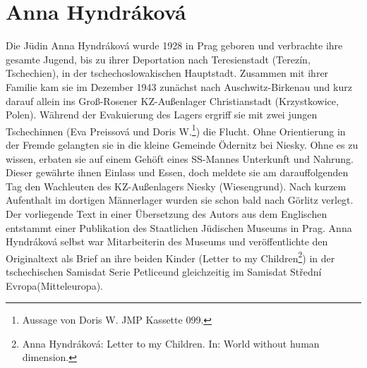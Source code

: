 \documentclass[a4paper,12pt,ngerman,
]{nisebook}
\begin{document}
\section*{Anna Hyndr\'akov\'a}
Die Jüdin Anna Hyndr\'akov\'a wurde 1928 in Prag geboren und verbrachte ihre gesamte Jugend, bis zu ihrer Deportation nach Teresienstadt (Terez\'in, Tschechien), in der tschechoslowakischen Hauptstadt. Zusammen mit ihrer Familie kam sie im Dezember 1943 zunächst nach Auschwitz-Birkenau und kurz darauf allein ins Groß-Rosener KZ-Außenlager Christianstadt (Krzystkowice, Polen). Während der Evakuierung des Lagers ergriff sie mit zwei jungen Tschechinnen (Eva Preissov\'a und Doris W.\footnote{Aussage von Doris W. JMP Kassette 099.}) die Flucht. Ohne Orientierung in der Fremde gelangten sie in die kleine Gemeinde Ödernitz bei Niesky. Ohne es zu wissen, erbaten sie auf einem Gehöft eines SS-Mannes Unterkunft und Nahrung. Dieser gewährte ihnen Einlass und Essen, doch meldete sie am darauffolgenden Tag den Wachleuten des KZ-Außenlagers Niesky (Wiesengrund). Nach kurzem Aufenthalt im dortigen Männerlager wurden sie schon bald nach Görlitz verlegt. Der vorliegende Text in einer Übersetzung des Autors aus dem Englischen entstammt einer Publikation des Staatlichen Jüdischen Museums in Prag. Anna Hyndr\'akov\'a selbst war Mitarbeiterin des Museums und veröffentlichte den Originaltext als Brief an ihre beiden Kinder (\glqq Letter to my Children\grqq\footnote{Anna Hyndr\'akov\'a: Letter to my Children. In: World without human dimension.}) in der tschechischen Samisdat Serie \glqq Petlice\grqq und gleichzeitig im Samisdat \glqq Středn\'i Evropa\grqq (Mitteleuropa).
\end{document}
